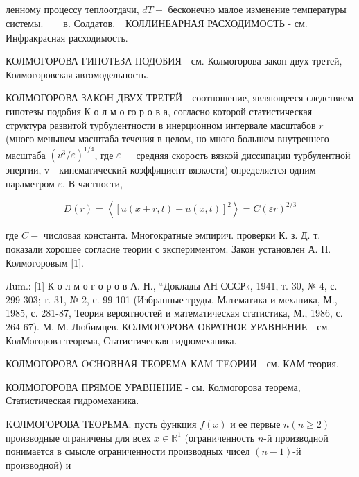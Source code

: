 \documentclass[10pt]{article}
\begin{document}
ленному процессу теплоотдачи, $d T-$ бесконечно малое изменение температуры системы. $\quad \begin{array}{ll}\text { в. Солдатов. }\end{array}$ КОЛЛИНЕАРНАЯ РАСХОДИМОСТЬ - см. Инфракрасная расходимость.



КОЛМОГОРОВА ГИПОТЕЗА ПОДОБИЯ - см. Колмогорова закон двух третей, Колмогоровская автомодельность.



КОЛМОГОРОВА ЗАКОН ДВУХ ТРЕТЕЙ - соотношение, являющееся следствием гипотезы подобия К о л м о го р о в а, согласно которой статистическая структура развитой турбулентности в инерционном интервале масштабов $r$ (много меньшем масштаба течения в целом, но много большем внутреннего масштаба $\left(v^{3} / \varepsilon\right)^{1 / 4}$, где $\varepsilon-$ средняя скорость вязкой диссипации турбулентной энергии, v - кинематический коэффициент вязкости) определяется одним параметром $\varepsilon$. В частности,



\[

D(r)=\left\langle[u(x+r, t)-u(x, t)]^{2}\right\rangle=C(\varepsilon r)^{2 / 3}

\]



где $C-$ числовая константа. Многократные эмпирич. проверки К. з. Д. т. показали хорошее согласие теории с экспериментом. Закон установлен А. Н. Колмогоровым [1].



Лum.: [1] К о л м о г о р о в А. Н., “Доклады АН СССР», 1941, т. 30, № 4, с. 299-303; т. 31, № 2, с. 99-101 (Избранные труды. Математика и механика, М., 1985, с. 281-87, Теория вероятностей и математическая статистика, М., 1986, с. 264-67). М. М. Любимцев. КОЛМОГОРОВА ОБРАТНОЕ УРАВНЕНИЕ - см. КолМогорова теорема, Статистическая гидромеханика.



КОЛМОГОРОВА OCHОВНАЯ TЕОРЕМА КАM-TEOРИИ - см. КАМ-теория.



КОЛМОГОРОВА ПРЯМОЕ УРАВНЕНИЕ - см. Колмогорова теорема, Статистическая гидромеханика.



KОЛМОГОРОВА ТЕОРЕМА: пусть функция $f(x)$ и ее первые $n(n \geqslant 2)$ производные ограничены для всех $x \in \mathbb{R}^{1}$ (ограниченность $n$-й производной понимается в смысле ограниченности производных чисел $(n-1)$-й производной) и
\end{document}
